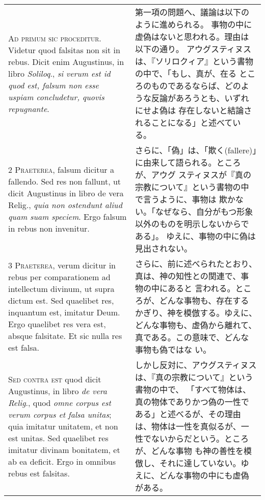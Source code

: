 \documentclass[paper=a4paper,fontsize=10pt,jafontsize=9pt,titlepage]{jlreq}
\begin{document}
\begin{longtable}{p{21em}p{21em}}

{\huge A}{\scshape d primum sic proceditur}. Videtur quod falsitas non
sit in rebus. Dicit enim Augustinus, in libro {\itshape Soliloq}.,
{\itshape si verum est id quod est, falsum non esse uspiam concludetur,
quovis repugnante}.

&
第一項の問題へ、議論は以下のように進められる。
事物の中に虚偽はないと思われる。理由は以下の通り。
アウグスティヌスは、『ソリロクィア』という書物の中で、「もし、真が、在る
 ところのものであるならば、どのような反論があろうとも、いずれにせよ偽は
 存在しないと結論されることになる」と述べている。

\\


{\scshape 2 Praeterea}, falsum dicitur a fallendo. Sed
res non fallunt, ut dicit Augustinus in libro de vera Relig., {\itshape quia non
ostendunt aliud quam suam speciem}. Ergo falsum in rebus non invenitur.

&

さらに、「偽」は、「欺く(fallere)」に由来して語られる。ところが、アウグ
 スティヌスが『真の宗教について』という書物の中で言うように、事物は
 欺かない。「なぜなら、自分がもつ形象以外のものを明示しないからである」。
 ゆえに、事物の中に偽は見出されない。

\\


{\scshape 3 Praeterea}, verum dicitur in rebus per
comparationem ad intellectum divinum, ut supra dictum est. Sed quaelibet
res, inquantum est, imitatur Deum. Ergo quaelibet res vera est, absque
falsitate. Et sic nulla res est falsa.

&

さらに、前に述べられたとおり、真は、神の知性との関連で、事物の中にあると
 言われる。ところが、どんな事物も、存在するかぎり、神を模倣する。ゆえに、
 どんな事物も、虚偽から離れて、真である。この意味で、どんな事物も偽ではな
 い。

\\


{\scshape Sed contra est} quod dicit Augustinus, in libro {\itshape de
vera Relig}., quod {\itshape omne corpus est verum corpus et falsa
unitas}; quia imitatur unitatem, et non est unitas. Sed quaelibet res
imitatur divinam bonitatem, et ab ea deficit. Ergo in omnibus rebus est
falsitas.

&
しかし反対に、アウグスティヌスは、『真の宗教について』という書物の中で、
 「すべて物体は、真の物体でありかつ偽の一性である」と述べるが、その理由
 は、物体は一性を真似るが、一性でないからだという。ところが、どんな事物
 も神の善性を模倣し、それに達していない。ゆえに、どんな事物の中にも虚偽
 がある。


\end{longtable}
\end{document}
